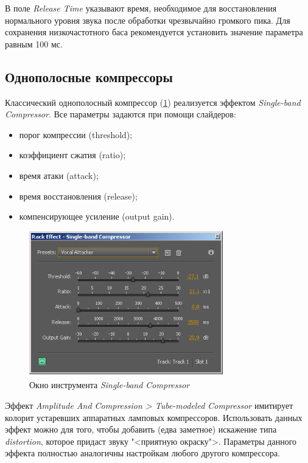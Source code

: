 \documentclass[oneside, final, 14pt]{extreport}
\begin{document}
В поле \emph{Release Time} указывают время, необходимое для восстановления нормального уровня звука после обработки чрезвычайно громкого пика. Для сохранения низкочастотного баса рекомендуется установить значение параметра равным 100 мс.

\subsection{Однополосные компрессоры}
Классический однополосный компрессор (\ref{pic-singleband-01}) реализуется эффектом \emph{Single-band Compressor}. Все параметры задаются при помощи слайдеров:
\begin{itemize}
  \item порог компрессии (threshold);
  \item коэффициент сжатия (ratio);
  \item время атаки (attack);
  \item время восстановления (release);
  \item компенсирующее усиление (output gain).
\end{itemize}

\begin{figure}[h!]
  \centering
  \includegraphics[width=0.75\textwidth]{pic-singleband-01}
  \caption{Окно инструмента \emph{Single-band Compressor}}
  \label{pic-singleband-01}
\end{figure}

Эффект \emph{Amplitude And Compression > Tube-modeled Compressor} имитирует колорит устаревших аппаратных ламповых компрессоров.
Использовать данных эффект можно для того, чтобы добавить (едва заметное) искажение типа \emph{distortion}, которое придаст звуку "<приятную окраску">. Параметры данного эффекта полностью аналогичны настройкам любого другого компрессора.
\end{document}

